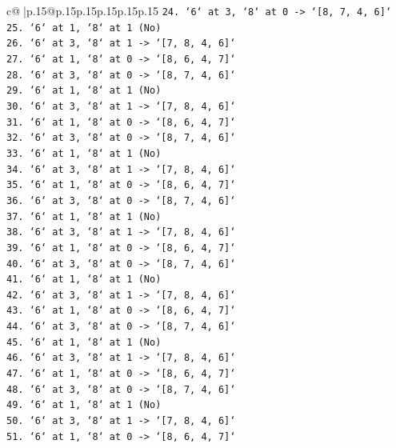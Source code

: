 \documentclass{article}
\begin{document}
{\begin{supertabular}{c@{$\;$}|p{.15\linewidth}@{}p{.15\linewidth}p{.15\linewidth}p{.15\linewidth}p{.15\linewidth}p{.15\linewidth}}
{{{\texttt{24. `6` at 3, `8` at 0 {-}> `{[}8, 7, 4, 6{]}`} \\
\texttt{25. `6` at 1, `8` at 1 (No)} \\
\texttt{26. `6` at 3, `8` at 1 {-}> `{[}7, 8, 4, 6{]}`} \\
\texttt{27. `6` at 1, `8` at 0 {-}> `{[}8, 6, 4, 7{]}`} \\
\texttt{28. `6` at 3, `8` at 0 {-}> `{[}8, 7, 4, 6{]}`} \\
\texttt{29. `6` at 1, `8` at 1 (No)} \\
\texttt{30. `6` at 3, `8` at 1 {-}> `{[}7, 8, 4, 6{]}`} \\
\texttt{31. `6` at 1, `8` at 0 {-}> `{[}8, 6, 4, 7{]}`} \\
\texttt{32. `6` at 3, `8` at 0 {-}> `{[}8, 7, 4, 6{]}`} \\
\texttt{33. `6` at 1, `8` at 1 (No)} \\
\texttt{34. `6` at 3, `8` at 1 {-}> `{[}7, 8, 4, 6{]}`} \\
\texttt{35. `6` at 1, `8` at 0 {-}> `{[}8, 6, 4, 7{]}`} \\
\texttt{36. `6` at 3, `8` at 0 {-}> `{[}8, 7, 4, 6{]}`} \\
\texttt{37. `6` at 1, `8` at 1 (No)} \\
\texttt{38. `6` at 3, `8` at 1 {-}> `{[}7, 8, 4, 6{]}`} \\
\texttt{39. `6` at 1, `8` at 0 {-}> `{[}8, 6, 4, 7{]}`} \\
\texttt{40. `6` at 3, `8` at 0 {-}> `{[}8, 7, 4, 6{]}`} \\
\texttt{41. `6` at 1, `8` at 1 (No)} \\
\texttt{42. `6` at 3, `8` at 1 {-}> `{[}7, 8, 4, 6{]}`} \\
\texttt{43. `6` at 1, `8` at 0 {-}> `{[}8, 6, 4, 7{]}`} \\
\texttt{44. `6` at 3, `8` at 0 {-}> `{[}8, 7, 4, 6{]}`} \\
\texttt{45. `6` at 1, `8` at 1 (No)} \\
\texttt{46. `6` at 3, `8` at 1 {-}> `{[}7, 8, 4, 6{]}`} \\
\texttt{47. `6` at 1, `8` at 0 {-}> `{[}8, 6, 4, 7{]}`} \\
\texttt{48. `6` at 3, `8` at 0 {-}> `{[}8, 7, 4, 6{]}`} \\
\texttt{49. `6` at 1, `8` at 1 (No)} \\
\texttt{50. `6` at 3, `8` at 1 {-}> `{[}7, 8, 4, 6{]}`} \\
\texttt{51. `6` at 1, `8` at 0 {-}> `{[}8, 6, 4, 7{]}`} \\
}}}
\end{supertabular}}
\end{document}
